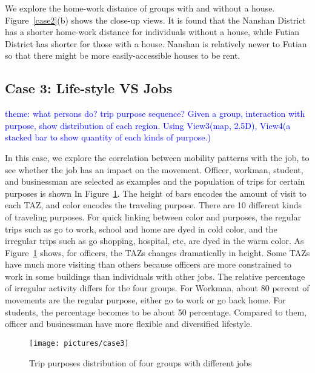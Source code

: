 We explore the home-work distance of groups with and without a house.
Figure~\ref{case2}(b) shows the close-up views. It is found that the Nanshan District has a shorter home-work distance for individuals without a house, while Futian District has shorter for those with a house. Nanshan is relatively newer to Futian so that there might be more easily-accessible houses to be rent.



\subsection{Case 3: Life-style VS Jobs}
\textcolor{blue}{theme: what persons do? trip purpose sequence? Given a group, interaction with purpose, show distribution of each region. Using View3(map, 2.5D), View4(a stacked bar to show quantity of each kinds of purpose.)}

In this case, we explore the correlation between mobility patterns with the job, to see whether the job has an impact on the movement. Officer, workman, student, and businessman are selected as examples and the population of trips for certain purposes is shown In Figure~\ref{case3}. The height of bars encodes the amount of visit to each TAZ, and color encodes the traveling purpose. There are 10 different kinds of traveling purposes. For quick linking between color and purposes, the regular trips such as go to work, school and home are dyed in cold color, and the irregular trips such as go shopping, hospital, etc, are dyed in the warm color. As Figure~\ref{case3} shows, for officers, the TAZs changes dramatically in height. Some TAZs have much more visiting than others because officers are more constrained to work in some buildings than individuals with other jobs. The relative percentage of irregular activity differs for the four groups. For Workman, about 80 percent of movements are the regular purpose, either go to work or go back home. For students, the percentage becomes to be about 50 percentage. Compared to them, officer and businessman have more flexible and diversified lifestyle.

\begin{figure}[htb!]
 \centering %
 \texttt{[image: pictures/case3]}
 \caption{Trip purposes distribution of four groups with different jobs}
 \label{case3}
\end{figure}


